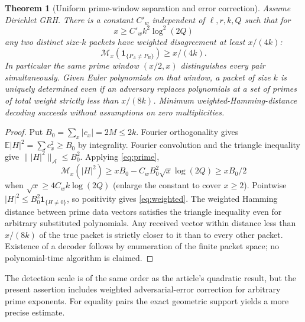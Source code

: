 \documentclass[11pt]{article}
\newtheorem{theorem}{Theorem}[section]
\theoremstyle{remark}\newtheorem{remark}[theorem]{Remark}
\newcommand{\E}{\mathbb E}
\newcommand{\one}{\mathbf 1}
\begin{document}
\begin{theorem}[Uniform prime-window separation and error correction]\label{thm:detect}
Assume Dirichlet GRH. There is a constant $C'_w$ independent of $\ell,r,k,Q$ such that for
\[
 x\ge C'_w k^2\log^2(2Q)
\]
any two distinct size-$k$ packets have weighted disagreement at least $x/(4k)$:
\begin{equation}\label{eq:weighted}
 \mathcal M_x(\one_{\{P_A\ne P_B\}})\ge x/(4k).
\end{equation}
In particular the same prime window $(x/2,x)$ distinguishes every pair simultaneously. Given Euler polynomials on that window, a packet of size $k$ is uniquely determined even if an adversary replaces polynomials at a set of primes of total weight strictly less than $x/(8k)$. Minimum weighted-Hamming-distance decoding succeeds without assumptions on zero multiplicities.
\end{theorem}
\begin{proof}
Put $B_0=\sum_x|c_x|=2M\le2k$. Fourier orthogonality gives $\E|H|^2=\sum c_x^2\ge B_0$ by integrality. Fourier convolution and the triangle inequality give $\||H|^2\|_{\mathcal A}\le B_0^2$. Applying \eqref{eq:prime},
\[
 \mathcal M_x(|H|^2)\ge xB_0-C_w B_0^2\sqrt{x}\log(2Q)\ge xB_0/2
\]
when $\sqrt{x}\ge 4C_w k\log(2Q)$ (enlarge the constant to cover $x\ge2$). Pointwise $|H|^2\le B_0^2\one_{\{H\ne0\}}$, so positivity gives \eqref{eq:weighted}. The weighted Hamming distance between prime data vectors satisfies the triangle inequality even for arbitrary substituted polynomials. Any received vector within distance less than $x/(8k)$ of the true packet is strictly closer to it than to every other packet. Existence of a decoder follows by enumeration of the finite packet space; no polynomial-time algorithm is claimed.
\end{proof}

The detection scale is of the same order as the article's quadratic result, but the present assertion includes weighted adversarial-error correction for arbitrary prime exponents. For equality pairs the exact geometric support yields a more precise estimate.
\end{document}

